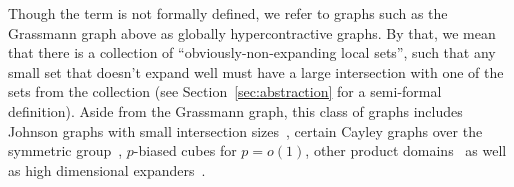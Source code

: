 
Though the term is not formally defined, we refer to graphs such 
as the Grassmann graph above as globally hypercontractive graphs. 
By that, we mean that there is a collection of 
``obviously-non-expanding local sets'', such that any small set that 
doesn't expand well must have a large intersection with one of the sets from 
the collection (see Section~\ref{sec:abstraction} for a semi-formal definition). Aside from the Grassmann graph, this 
class of graphs includes Johnson graphs with small intersection sizes~\cite{KMMS},
certain Cayley graphs over 
the symmetric group~\cite{filmus2020hypercontractivity},
$p$-biased cubes for $p=o(1)$, other product domains~\cite{keevash2021global} as well as high dimensional expanders~\cite{gur2022hypercontractivity,bafna2022hypercontractivity}.


